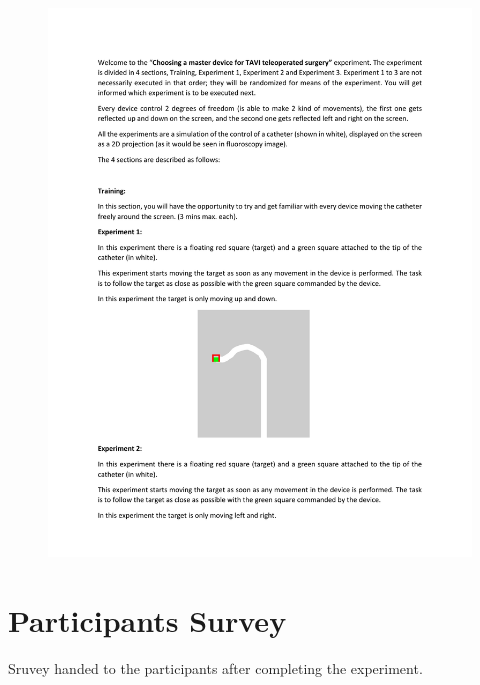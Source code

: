   \begin{figure}
    \centering
    \includegraphics[page={2}, width=1.0\linewidth ]{img/InstructionsQuestionary.pdf}
  \end{figure}

 \cleardoublepage


\chapter{Participants Survey}\label{sec:apsurv}

Sruvey handed to the participants after completing the experiment.


